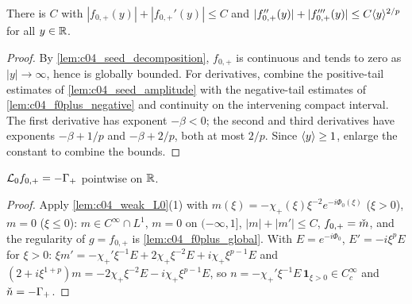 \begin{lemma}
  \label{lem:c04_f0plus_global}
  There is $C$ with $|f_{0,+}(y)|+|f_{0,+}'(y)|\le C$ and $|f_{0,+}''(y)|+|f_{0,+}'''(y)|\le C\ang y^{2/p}$ for all $y\in\R$.
\end{lemma}
\begin{proof}
  By \cref{lem:c04_seed_decomposition}, $f_{0,+}$ is continuous and tends to zero as
  $|y|\to\infty$, hence is globally bounded. For derivatives, combine the positive-tail
  estimates of \cref{lem:c04_seed_amplitude} with the negative-tail estimates of
  \cref{lem:c04_f0plus_negative} and continuity on the intervening compact interval.
  The first derivative has exponent $-\beta<0$; the second and third derivatives have
  exponents $-\beta+1/p$ and $-\beta+2/p$, both at most $2/p$.
  Since $\ang y\ge1$, enlarge the constant to combine the bounds.
\end{proof}

\begin{lemma}[$\mc L_0$ applied to $f_{0,+}$]
  \label{lem:c04_L0_f0plus}
  $\mc L_0f_{0,+}=-\Gamma_+$ pointwise on $\R$.
\end{lemma}
\begin{proof}
  Apply \cref{lem:c04_weak_L0}(1) with $m(\xi)=-\chi_+(\xi)\xi^{-2}e^{-i\Phi_0(\xi)}$ ($\xi>0$), $m=0$ ($\xi\le0$): $m\in C^\infty\cap L^1$,
  $m=0$ on $(-\infty,1]$, $|m|+|m'|\le C$, $f_{0,+}=\widecheck m$, and the regularity of $g=f_{0,+}$ is
  \cref{lem:c04_f0plus_global}. With $E=e^{-i\Phi_0}$, $E'=-i\xi^pE$ for $\xi>0$:
  $\xi m'=-\chi_+'\xi^{-1}E+2\chi_+\xi^{-2}E+i\chi_+\xi^{p-1}E$ and $(2+i\xi^{1+p})m=-2\chi_+\xi^{-2}E-i\chi_+\xi^{p-1}E$, so
  $n=-\chi_+'\xi^{-1}E\,\mathbf 1_{\xi>0}\in C_c^\infty$ and $\widecheck n=-\Gamma_+$.
\end{proof}

